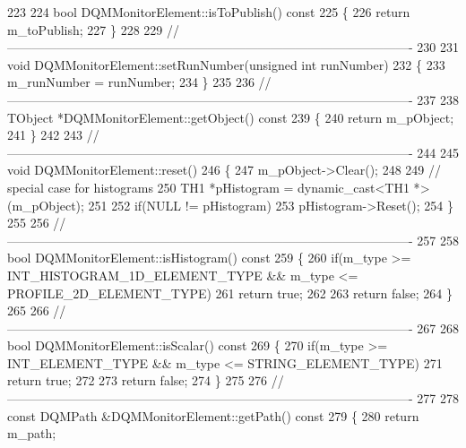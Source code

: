 \begin{DoxyCode}
223 
224 \textcolor{keywordtype}{bool} DQMMonitorElement::isToPublish()\textcolor{keyword}{ const}
225 \textcolor{keyword}{}\{
226   \textcolor{keywordflow}{return} m\_toPublish;
227 \}
228 
229 \textcolor{comment}{//-------------------------------------------------------------------------------------------------}
230 
231 \textcolor{keywordtype}{void} DQMMonitorElement::setRunNumber(\textcolor{keywordtype}{unsigned} \textcolor{keywordtype}{int} runNumber)
232 \{
233   m\_runNumber = runNumber;
234 \}
235 
236 \textcolor{comment}{//-------------------------------------------------------------------------------------------------}
237 
238 TObject *DQMMonitorElement::getObject()\textcolor{keyword}{ const}
239 \textcolor{keyword}{}\{
240   \textcolor{keywordflow}{return} m\_pObject;
241 \}
242 
243 \textcolor{comment}{//-------------------------------------------------------------------------------------------------}
244 
245 \textcolor{keywordtype}{void} DQMMonitorElement::reset()
246 \{
247   m\_pObject->Clear();
248 
249   \textcolor{comment}{// special case for histograms}
250   TH1 *pHistogram = \textcolor{keyword}{dynamic\_cast<}TH1 *\textcolor{keyword}{>}(m\_pObject);
251 
252   \textcolor{keywordflow}{if}(NULL != pHistogram)
253     pHistogram->Reset();
254 \}
255 
256 \textcolor{comment}{//-------------------------------------------------------------------------------------------------}
257 
258 \textcolor{keywordtype}{bool} DQMMonitorElement::isHistogram()\textcolor{keyword}{ const}
259 \textcolor{keyword}{}\{
260   \textcolor{keywordflow}{if}(m\_type >= INT\_HISTOGRAM\_1D\_ELEMENT\_TYPE && m\_type <= PROFILE\_2D\_ELEMENT\_TYPE)
261     \textcolor{keywordflow}{return} \textcolor{keyword}{true};
262 
263   \textcolor{keywordflow}{return} \textcolor{keyword}{false};
264 \}
265 
266 \textcolor{comment}{//-------------------------------------------------------------------------------------------------}
267 
268 \textcolor{keywordtype}{bool} DQMMonitorElement::isScalar()\textcolor{keyword}{ const}
269 \textcolor{keyword}{}\{
270   \textcolor{keywordflow}{if}(m\_type >= INT\_ELEMENT\_TYPE && m\_type <= STRING\_ELEMENT\_TYPE)
271     \textcolor{keywordflow}{return} \textcolor{keyword}{true};
272 
273   \textcolor{keywordflow}{return} \textcolor{keyword}{false};
274 \}
275 
276 \textcolor{comment}{//-------------------------------------------------------------------------------------------------}
277 
278 \textcolor{keyword}{const} DQMPath &DQMMonitorElement::getPath()\textcolor{keyword}{ const}
279 \textcolor{keyword}{}\{
280   \textcolor{keywordflow}{return} m\_path;

\end{DoxyCode}
